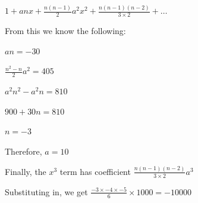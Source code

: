 \documentclass[../main.tex]{subfiles}
\begin{document}
\begin{enumerate}
    \(1+anx+\frac{n(n-1)}{2}a^2x^2+\frac{n(n-1)(n-2)}{3\times 2}+\dots \)

    From this we know the following:

    \(an = -30 \)

    \(\frac{n^2-n}{2}a^2=405 \)

    \(a^2n^2-a^2n=810 \)
    
    \(900+30n=810 \)

    \(n=-3\)

    Therefore, \(a=10\)

    Finally, the \(x^3\) term has coefficient \(\frac{n(n-1)(n-2)}{3\times 2}a^3 \)

    Substituting in, we get \(\frac{-3 \times -4 \times -5}{6}\times 1000 = -10000 \)

\end{enumerate}
\end{document}
